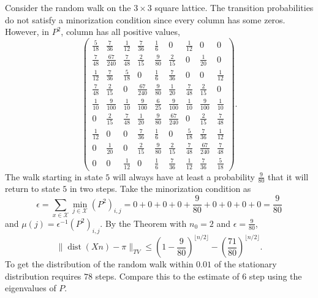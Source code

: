 \documentclass[12pt]{article}
\begin{document}
\begin{example}
    Consider the random walk on the \( 3 \times 3 \) square lattice.
    The transition probabilities do not satisfy a minorization condition
    since every column has some zeros.  However, in \( P^2 \), column
    has all positive values,
    \[
        \begin{pmatrix}
            \frac{5}{18} & \frac{7}{36} & \frac{1}{12} & \frac{7}{36} &
            \frac{1}{6} & 0 & \frac{1}{12} & 0 & 0\\
            \frac{7}{48} & \frac{67}{240} & \frac{7}{48} & \frac{2}{15}
            & \frac{9}{80} & \frac{2}{15} & 0 & \frac{1}{20} & 0\\
            \frac{1}{12} & \frac{7}{36} & \frac{5}{18} & 0 & \frac{1}{6}
            & \frac{7}{36} & 0 & 0 & \frac{1}{12}\\
            \frac{7}{48} & \frac{2}{15} & 0 & \frac{67}{240} & \frac{9}{80}
            & \frac{1}{20} & \frac{7}{48} & \frac{2}{15} & 0\\
            \frac{1}{10} & \frac{9}{100} & \frac{1}{10} & \frac{9}{100}
            & \frac{6}{25} & \frac{9}{100} & \frac{1}{10} & \frac{9}{100}
            & \frac{1}{10}\\
            0 & \frac{2}{15} & \frac{7}{48} & \frac{1}{20} & \frac{9}{80}
            & \frac{67}{240} & 0 & \frac{2}{15} & \frac{7}{48}\\
            \frac{1}{12} & 0 & 0 & \frac{7}{36} & \frac{1}{6} & 0 &
            \frac{5}{18} & \frac{7}{36} & \frac{1}{12}\\
            0 & \frac{1}{20} & 0 & \frac{2}{15} & \frac{9}{80} & \frac{2}
            {15} & \frac{7}{48} & \frac{67}{240} & \frac{7}{48}\\
            0 & 0 & \frac{1}{12} & 0 & \frac{1}{6} & \frac{7}{36} &
            \frac{1}{12} & \frac{7}{36} & \frac{5}{18}
        \end{pmatrix}
        .
    \] The walk starting in state \( 5 \) will always have at least a
    probability \( \frac{9}{80} \) that it will return to state \( 5 \)
    in two steps.  Take the minorization condition as
    \[
        \epsilon = \sum_{x \in \mathcal{X}} \min_{j \in \mathcal{X}} (P^2)_
        {i,j} = 0 + 0 + 0 + 0 + \frac{9}{80} + 0 + 0 + 0 + 0 = \frac{9}{80}
    \] and \( \mu(j) = \epsilon^{-1} (P^2)_{i,j} \).  By the Theorem
    with \( n_0 = 2 \) and \( \epsilon = \frac{9}{80} \),
    \[
        \|
        \operatorname{dist}
        (Xn) - \pi \|_{TV} \le (1-\frac{9}{80})^{\lfloor n/2 \rfloor} -
        \left( \frac{71}{80} \right)^{\lfloor n/2 \rfloor}.
    \] To get the distribution of the random walk within \( 0.01 \) of
    the stationary distribution requires \( 78 \) steps.  Compare this
    to the estimate of \( 6 \) step using the eigenvalues of \( P \).
\end{example}
\end{document}
